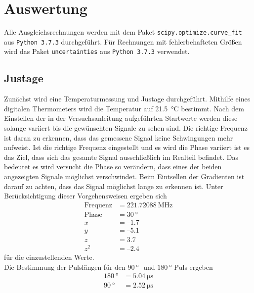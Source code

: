 \section{Auswertung}

Alle Ausgleichsrechnungen werden mit dem Paket \texttt{scipy.optimize.curve\_fit}  aus \texttt{Python 3.7.3} durchgeführt.
Für Rechnungen mit fehlerbehafteten Größen wird das Paket \texttt{uncertainties} aus \texttt{Python 3.7.3} verwendet.\\

\subsection{Justage}
Zunächst wird eine Temperaturmessung und Justage durchgeführt. Mithilfe eines digitalen Thermometers wird die Temperatur 
auf \SI{21.5}{\degreeCelsius} bestimmt. Nach dem Einstellen der in der Versuchsanleitung \cite{anleitung} aufgeführten Startwerte
werden diese solange variiert bis die gewünschten Signale zu sehen sind.
Die richtige Frequenz ist daran zu erkennen, dass das gemessene Signal keine Schwingungen mehr aufweist. Ist die richtige Frequenz
eingestellt und es wird die Phase variiert ist es das Ziel, dass sich das gesamte Signal ausschließlich im Realteil befindet.
Das bedeutet es wird versucht die Phase so verändern, dass eines der beiden angezeigten Signale möglichst verschwindet.
Beim Eintsellen der Gradienten ist darauf zu achten, dass das Signal möglichst lange zu erkennen ist. 
Unter Berücksichtigung dieser Vorgehensweisen ergeben sich
\begin{align}
  \text{Frequenz}&=\SI{221.72088}{\mega\hertz} \\
  \text{Phase} &= \SI{30}{\degree} \\
    x&=–1.7 \\
    y&=–5.1 \\
    z&=3.7 \\
    z^2 &=–2.4
\end{align} \noindent
für die einzustellenden Werte. \\
Die Bestimmung der Pulslängen für den $\SI{90}{\degree}$- und $\SI{180}{\degree}$-Puls ergeben
\begin{align}
  \SI{180}{\degree} &= \SI{5.04}{\micro\second}\\
  \SI{90}{\degree}  &= \SI{2.52}{\micro\second}
\end{align} \noindent

